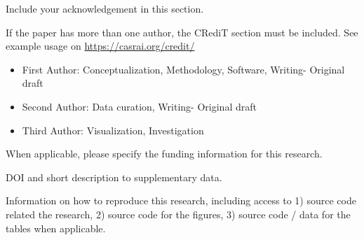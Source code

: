 \documentclass[
  manuscript=article,  %
  layout=preprint,  %
  year=20xx,
  volume=x,
]{extra/joas}
\begin{document}
\begin{acknowledgement}
  Include your acknowledgement in this section.
\end{acknowledgement}

\begin{credit}
  If the paper has more than one author, the CRediT section must be included. See example usage on \url{https://casrai.org/credit/}

  \begin{itemize}
    \item First Author: Conceptualization, Methodology, Software, Writing- Original draft
    \item Second Author: Data curation, Writing- Original draft
    \item Third Author: Visualization, Investigation
  \end{itemize}
\end{credit}


\begin{funding}
  When applicable, please specify the funding information for this research.
\end{funding}


\begin{opendata}
  DOI and short description to supplementary data.
\end{opendata}

\begin{reproduce}
Information on how to reproduce this research, including access to 1) source code related the research, 2) source code for the figures, 3) source code / data for the tables when applicable.
\end{reproduce}



\printbibliography
\end{document}
